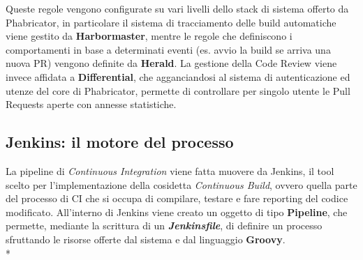 \documentclass[../main.tex]{subfiles}
\begin{document}
        	    Queste regole vengono configurate su vari livelli dello stack di sistema offerto da Phabricator, in particolare il sistema di tracciamento delle build automatiche viene gestito da \textbf{Harbormaster}, mentre le regole che definiscono i comportamenti in base a determinati eventi (es. avvio la build se arriva una nuova PR) vengono definite da \textbf{Herald}. La gestione della Code Review viene invece affidata a \textbf{Differential}, che agganciandosi al sistema di autenticazione ed utenze del core di Phabricator, permette di controllare per singolo utente le Pull Requests aperte con annesse statistiche.
        	
        	\subsection{Jenkins: il motore del processo}
        	
        	    La pipeline di \emph{Continuous Integration} viene fatta muovere da Jenkins, il tool scelto per l'implementazione della cosidetta \emph{Continuous Build}, ovvero quella parte del processo di CI che si occupa di compilare, testare e fare reporting del codice modificato. All'interno di Jenkins viene creato un oggetto di tipo \textbf{Pipeline}, che permette, mediante la scrittura di un \textbf{\emph{Jenkinsfile}}, di definire un processo sfruttando le risorse offerte dal sistema e dal linguaggio \textbf{Groovy}.\\*
        	    
\end{document}
